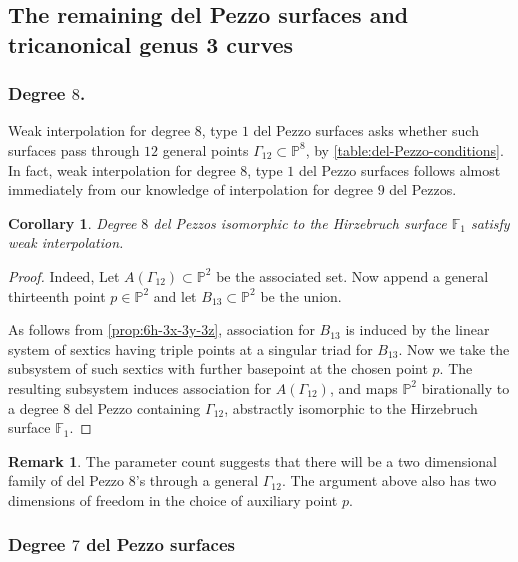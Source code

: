 \documentclass[reqno, 11pt]{amsart}
\theoremstyle{definition}
\theoremstyle{remark}
\numberwithin{equation}{section}
\numberwithin{thm}{section}
\numberwithin{prop}{section}
\numberwithin{lem}{section}
\numberwithin{cor}{section}
\numberwithin{conj}{section}
\numberwithin{defn}{section}
\newcommand{\F}{{\mathbb F}}
\theoremstyle{plain}
\newtheorem{corollary}[theorem]{Corollary}
\theoremstyle{definition}
\newtheorem{remark}[theorem]{Remark}
\newcommand\bp{{\mathbb P}}
\begin{document}
\subsection{The remaining del Pezzo surfaces and tricanonical genus 3 curves} 
\label{ssec:degrees-7-and-8}
\subsubsection{Degree $8$.} 
Weak interpolation for degree $8$, type $1$ del Pezzo surfaces asks
 whether such surfaces pass through $12$ general points $\Gamma_{12} \subset \bp^{8}$,
by \autoref{table:del-Pezzo-conditions}. In fact, weak interpolation
for degree $8$, type $1$ del Pezzo surfaces follows almost immediately from our knowledge of interpolation for degree $9$ del Pezzos. 

\begin{corollary}
  \label{corollary:degree-8-type-1-interpolation}
Degree $8$ del Pezzos isomorphic to the Hirzebruch surface $\F_{1}$ satisfy weak interpolation.
\end{corollary}

\begin{proof}

Indeed, Let $A(\Gamma_{12}) \subset \bp^{2}$ be the associated set. Now append a general thirteenth point $p \in \bp^{2}$ and let $B_{13} \subset \bp^{2}$ be the union. 

As follows from \autoref{prop:6h-3x-3y-3z}, association for $B_{13}$ is induced by the linear system of sextics having triple points at a singular triad for $B_{13}$.  Now we take the subsystem of such sextics with further basepoint at the chosen point $p$.  The resulting subsystem induces association for $A(\Gamma_{12})$, and maps $\bp^{2}$ birationally to a degree $8$ del Pezzo containing $\Gamma_{12}$, abstractly isomorphic to the Hirzebruch surface $\F_{1}$.
\end{proof} 

\begin{remark}
The parameter count suggests that there will be a two dimensional family of del Pezzo $8$'s through a general $\Gamma_{12}$. The argument above also has two dimensions of freedom in the choice of auxiliary point $p$.
\end{remark}

\subsubsection{Degree $7$ del Pezzo surfaces} 
\end{document}
